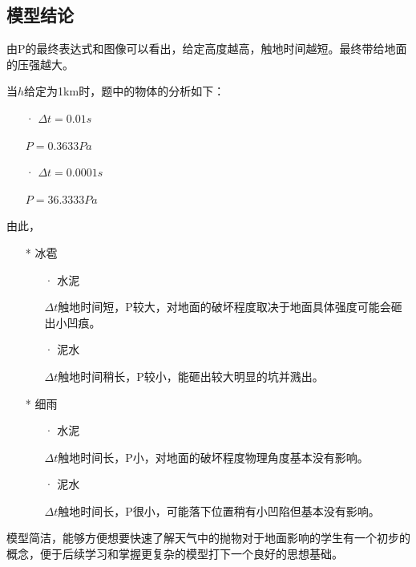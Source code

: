 \documentclass[a4paper,AutoFakeBold,AutoFakeSlant]{ctexart}
\begin{document}
\subsection{模型结论}
由P的最终表达式和图像可以看出，给定高度越高，触地时间越短。最终带给地面的压强越大。

当$ h $给定为1km时，题中的物体的分析如下：
\begin{itemize}
  \item[·] $\Delta t = 0.01s$
  \item[] $ P = 0.3633 Pa $
\end{itemize}
\begin{itemize}
  \item[·] $\Delta t = 0.0001s$
  \item[] $ P = 36.3333 Pa $
\end{itemize}
由此，

\begin{itemize}
  \item[*] 冰雹
  \begin{itemize} 
    \item[·] 水泥
    \item[] $\Delta t$触地时间短，P较大，对地面的破坏程度取决于地面具体强度可能会砸出小凹痕。
    \item[·] 泥水
    \item[] $\Delta t$触地时间稍长，P较小，能砸出较大明显的坑并溅出。
  \end{itemize} 
\end{itemize}

\begin{itemize}
  \item[*] 细雨
  \begin{itemize} 
    \item[·] 水泥
    \item[] $\Delta t$触地时间长，P小，对地面的破坏程度物理角度基本没有影响。
    \item[·] 泥水
    \item[] $\Delta t$触地时间长，P很小，可能落下位置稍有小凹陷但基本没有影响。
  \end{itemize} 
\end{itemize}

模型简洁，能够方便想要快速了解天气中的抛物对于地面影响的学生有一个初步的概念，便于后续学习和掌握更复杂的模型打下一个良好的思想基础。
\end{document}
